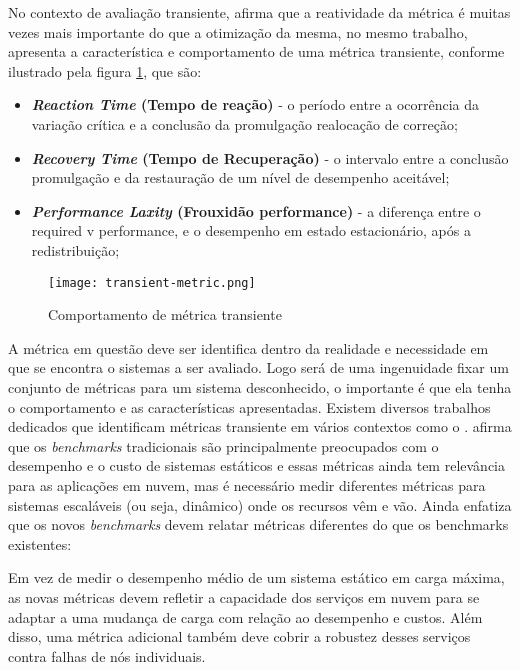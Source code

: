 No contexto de avaliação transiente, \cite{Rosu1997} afirma que a reatividade da métrica é muitas vezes mais importante do que a otimização da mesma, no mesmo trabalho, \cite{Rosu1997} apresenta a característica e comportamento de uma métrica transiente, conforme ilustrado pela figura \ref{fig:transient-metric}, que são: 
\begin{itemize}
	\item \textbf{\textit{Reaction Time} (Tempo de reação)} - o período entre a ocorrência da variação crítica e a conclusão da promulgação realocação de correção;
	
	\item \textbf{\textit{Recovery Time} (Tempo de Recuperação)}  - o intervalo entre a conclusão promulgação e da restauração de um nível de desempenho aceitável;
	
	\item \textbf{\textit{Performance Laxity} (Frouxidão performance)} - a diferença entre o required v performance, e o desempenho em estado estacionário, após a redistribuição;
\end{itemize}


\begin{figure}[!htb]
	\centering
	\texttt{[image: transient-metric.png]}
	\caption{Comportamento de métrica transiente}
	\label{fig:transient-metric}
\end{figure}


A métrica em questão deve ser identifica dentro da realidade e necessidade em que se encontra o sistemas a ser avaliado. Logo será de uma ingenuidade fixar um conjunto de métricas para um sistema desconhecido, o importante é que ela tenha o comportamento e as características apresentadas. Existem diversos trabalhos dedicados que identificam métricas transiente em vários contextos como o \cite{Binnig2009, Lu2000, Rosu1997}.
\cite{Binnig2009} afirma que os \textit{benchmarks} tradicionais são principalmente preocupados com o desempenho e o custo de sistemas estáticos e essas métricas ainda tem relevância para as aplicações em nuvem, mas é necessário medir diferentes métricas para sistemas escaláveis (ou seja, dinâmico) onde os recursos vêm e vão. Ainda \cite{Binnig2009} enfatiza que os novos \textit{benchmarks} devem relatar métricas diferentes do que os benchmarks existentes: 
\begin{citacao}
	Em vez de medir o desempenho médio de um sistema estático em carga máxima, as novas métricas devem refletir a capacidade dos serviços em nuvem para se adaptar a uma mudança de carga com relação ao desempenho e custos. Além disso, uma métrica adicional também deve cobrir a robustez desses serviços contra falhas de nós individuais.
\end{citacao}


